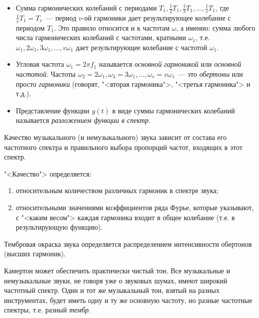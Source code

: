 \documentclass{beamer}
\begin{document}
\begin{frame}
\begin{itemize}
\item Сумма гармонических колебаний с периодами \(T_1, \frac{1}{2}T_1, \frac{1}{3}T_1,...,\frac{1}{v}T_1\), где \(\frac{1}{v}T_1=T_v\)~--- период \(v\)-ой гармоники дает результирующее колебание с периодом \(T_1\). Это правило относится и к частотам \(\omega\), а именно: сумма любого числа гармонических колебаний с частотами, кратными \(\omega_1\), т.е. \(\omega_1, 2\omega_1,3\omega_1,...,v\omega_1\) дает результирующее колебание с частотой \(\omega_1\).
\pause
\item Угловая частота \(\omega_1=2\pi f_1\) называется {\itshape основной гармоникой} или {\itshape основной частотой}. Частоты \(\omega_2=2\omega_1, \omega_3=3\omega_1,...,\omega_v=v\omega_1\)~--- это {\itshape обертоны} или просто {\itshape гармоники} (говорят, "<вторая гармоника">, "<третья гармоника"> и т.д.).
\pause
\item Представление функции \(y(t)\) в виде суммы гармонических колебаний называется {\itshape разложением функции в спектр}. 
\end{itemize}
\end{frame}   

\begin{frame}
Качество музыкального (и немузыкального) звука зависит от состава его частотного спектра и правильного выбора пропорций частот, входящих в этот спектр. 

"<Качество"> определяется: 
\begin{enumerate}
\item относительным количеством различных гармоник в спектре звука;
\item относительными значениями коэффициентов ряда Фурье, которые указывают, с "<каким весом"> каждая гармоника входит в общее колебание (т.е. в результирующую функцию). 
\end{enumerate}
\begin{block}{Тембровая окраска звука} 
определяется распределением интенсивности обертонов (высших гармоник). 
\end{block}
Камертон может обеспечить практически чистый тон. Все музыкальные и немузыкальные звуки, не говоря уже о звуковых шумах, имеют широкий частотный спектр. 
Один и тот же музыкальный тон, взятый на разных инструментах, будет иметь одну и ту же основную частоту, но разные частотные спектры, т.е. разный {\itshape тембр}. 
\end{frame}  
\end{document}
